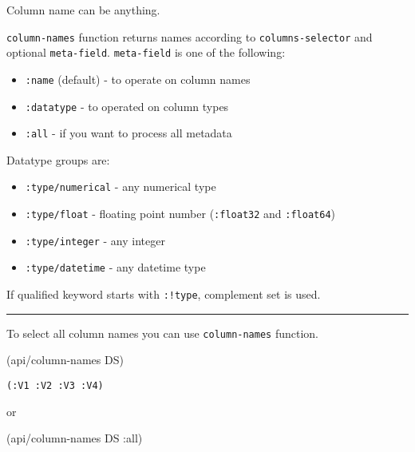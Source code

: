 \documentclass[]{article}
\newenvironment{Shaded}{\begin{snugshade}}{\end{snugshade}}
\newcommand{\AttributeTok}[1]{\textcolor[rgb]{0.77,0.63,0.00}{#1}}
\newcommand{\NormalTok}[1]{#1}
\providecommand{\tightlist}{%
  \setlength{\itemsep}{0pt}\setlength{\parskip}{0pt}}
\begin{document}
Column name can be anything.

\texttt{column-names} function returns names according to
\texttt{columns-selector} and optional \texttt{meta-field}.
\texttt{meta-field} is one of the following:

\begin{itemize}
\tightlist
\item
  \texttt{:name} (default) - to operate on column names
\item
  \texttt{:datatype} - to operated on column types
\item
  \texttt{:all} - if you want to process all metadata
\end{itemize}

Datatype groups are:

\begin{itemize}
\tightlist
\item
  \texttt{:type/numerical} - any numerical type
\item
  \texttt{:type/float} - floating point number (\texttt{:float32} and
  \texttt{:float64})
\item
  \texttt{:type/integer} - any integer
\item
  \texttt{:type/datetime} - any datetime type
\end{itemize}

If qualified keyword starts with \texttt{:!type}, complement set is
used.

\begin{center}\rule{0.5\linewidth}{0.5pt}\end{center}

To select all column names you can use \texttt{column-names} function.

\begin{Shaded}
\begin{Highlighting}[]
\NormalTok{(api/column-names DS)}
\end{Highlighting}
\end{Shaded}

\begin{verbatim}
(:V1 :V2 :V3 :V4)
\end{verbatim}

or

\begin{Shaded}
\begin{Highlighting}[]
\NormalTok{(api/column-names DS }\AttributeTok{:all}\NormalTok{)}
\end{Highlighting}
\end{Shaded}
\end{document}
